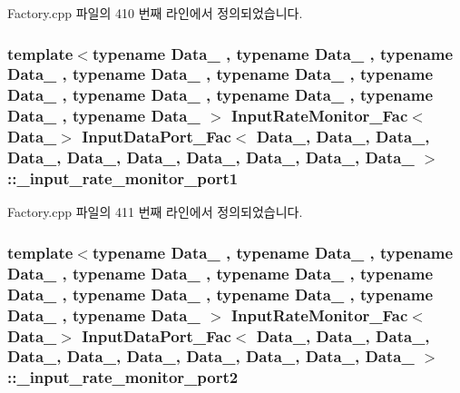 Factory.\+cpp 파일의 410 번째 라인에서 정의되었습니다.

\subsubsection[{\texorpdfstring{\+\_\+input\+\_\+rate\+\_\+monitor\+\_\+port1}{_input_rate_monitor_port1}}]{\setlength{\rightskip}{0pt plus 5cm}template$<$typename Data\+\_ , typename Data\+\_ , typename Data\+\_ , typename Data\+\_ , typename Data\+\_ , typename Data\+\_ , typename Data\+\_ , typename Data\+\_ , typename Data\+\_ , typename Data\+\_ $>$ {\bf Input\+Rate\+Monitor\+\_\+\+Fac}$<$Data\+\_$>$ {\bf Input\+Data\+Port\+\_\+\+Fac}$<$ Data\+\_, Data\+\_, Data\+\_, Data\+\_, Data\+\_, Data\+\_, Data\+\_, Data\+\_, Data\+\_, Data\+\_ $>$\+::\+\_\+input\+\_\+rate\+\_\+monitor\+\_\+port1\hspace{0.3cm}{\ttfamily [private]}}\hypertarget{classInputDataPort__Fac_aaff3c7535d1e29e218a6653e7f874e34}{}\label{classInputDataPort__Fac_aaff3c7535d1e29e218a6653e7f874e34}


Factory.\+cpp 파일의 411 번째 라인에서 정의되었습니다.

\subsubsection[{\texorpdfstring{\+\_\+input\+\_\+rate\+\_\+monitor\+\_\+port2}{_input_rate_monitor_port2}}]{\setlength{\rightskip}{0pt plus 5cm}template$<$typename Data\+\_ , typename Data\+\_ , typename Data\+\_ , typename Data\+\_ , typename Data\+\_ , typename Data\+\_ , typename Data\+\_ , typename Data\+\_ , typename Data\+\_ , typename Data\+\_ $>$ {\bf Input\+Rate\+Monitor\+\_\+\+Fac}$<$Data\+\_$>$ {\bf Input\+Data\+Port\+\_\+\+Fac}$<$ Data\+\_, Data\+\_, Data\+\_, Data\+\_, Data\+\_, Data\+\_, Data\+\_, Data\+\_, Data\+\_, Data\+\_ $>$\+::\+\_\+input\+\_\+rate\+\_\+monitor\+\_\+port2\hspace{0.3cm}{\ttfamily [private]}}\hypertarget{classInputDataPort__Fac_afa172d6bd94489f7634ad91440c10a16}{}\label{classInputDataPort__Fac_afa172d6bd94489f7634ad91440c10a16}


